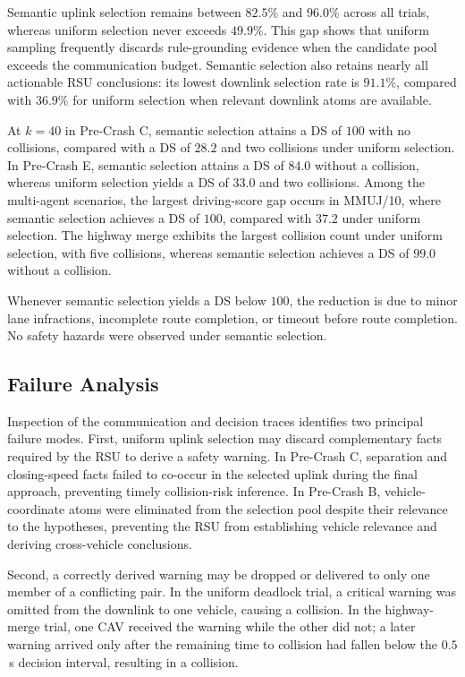 \documentclass[10pt, conference, letterpaper]{ IEEEtran}
\theoremstyle{bfnote}
\begin{document}
Semantic uplink selection remains between $82.5\%$ and $96.0\%$ across all
trials, whereas uniform selection never exceeds $49.9\%$. This gap shows
that uniform sampling frequently discards rule-grounding evidence when the
candidate pool exceeds the communication budget. Semantic selection also
retains nearly all actionable RSU conclusions: its lowest downlink
selection rate is $91.1\%$, compared with $36.9\%$ for uniform selection
when relevant downlink atoms are available.

At $k=40$ in Pre-Crash C, semantic selection attains a DS of $100$ with no
collisions, compared with a DS of $28.2$ and two collisions under uniform
selection. In Pre-Crash E, semantic selection attains a DS of $84.0$
without a collision, whereas uniform selection yields a DS of $33.0$ and
two collisions. Among the multi-agent scenarios, the largest driving-score
gap occurs in MMUJ/10, where semantic selection achieves a DS of $100$,
compared with $37.2$ under uniform selection. The highway merge exhibits
the largest collision count under uniform selection, with five collisions,
whereas semantic selection achieves a DS of $99.0$ without a collision.

Whenever semantic selection yields a DS below $100$, the reduction is due
to minor lane infractions, incomplete route completion, or timeout before
route completion. No safety hazards were observed under semantic selection.

\subsection{Failure Analysis}
\label{sec:discussion}
Inspection of the communication and decision traces identifies two
principal failure modes. First, uniform uplink selection may discard
complementary facts required by the RSU to derive a safety warning. In
Pre-Crash C, separation and closing-speed facts failed to co-occur in the
selected uplink during the final approach, preventing timely collision-risk
inference. In Pre-Crash B, vehicle-coordinate atoms were eliminated from
the selection pool despite their relevance to the hypotheses, preventing
the RSU from establishing vehicle relevance and deriving cross-vehicle
conclusions.

Second, a correctly derived warning may be dropped or delivered to only
one member of a conflicting pair. In the uniform deadlock trial, a critical
warning was omitted from the downlink to one vehicle, causing a collision.
In the highway-merge trial, one CAV received the warning while the other
did not; a later warning arrived only after the remaining time to collision
had fallen below the $0.5$\,s decision interval, resulting in a collision.
\end{document}
